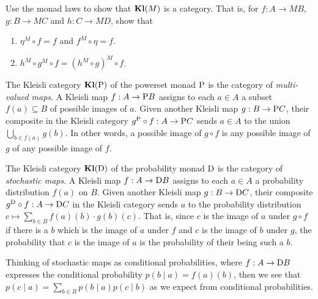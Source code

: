 \documentclass[DynamicalBook]{subfiles}
\begin{document}
\begin{exercise}
  Use the monad laws to show that $\textbf{Kl}(M)$ is a category. That is, for $f :
  A \to M B$, $g : B \to MC$ and $h : C \to MD$, show that
  \begin{enumerate}
    \item $\eta^M \circ f = f$ and $f^M \circ \eta = f$.
    \item $h^M \circ g^M \circ f = (h^M \circ g)^M \circ f$.
  \end{enumerate}
\end{exercise}

\begin{example}\label{ex.powerset_kleisli}
  The Kleisli category $\textbf{Kl}(\mathrm{P})$ of the powerset monad $\mathrm{P}$ is
  the category of \emph{multi-valued maps}. A Kleisli map $f : A \to
  \mathrm{P} B$ assigns to each $a \in A$ a subset $f(a) \subseteq B$ of possible
  images of $a$. Given another Kleisli map $g : B \to \mathrm{P} C$, their
  composite in the Kleisli category $g^{\mathrm{P}} \circ f : A \to \mathrm{P} C$
  sends $a \in A$ to the union $\bigcup_{b \in f(a)} g(b)$. In other words, a
  possible image of $g \circ f$ is any possible image of $g$ of any possible
  image of $f$.
\end{example}

\begin{example}\label{ex.probset_kleisli}
  The Kleisli category $\textbf{Kl}(\mathrm{D})$ of the probability monad $\mathrm{D}$
  is the category of \emph{stochastic maps}. A Kleisli map $f : A \to \mathrm{D}
  B$ assigns to each $a \in A$ a probability distribution $f(a)$ on $B$. Given
  another Kleisli map $g : B \to \mathrm{D} C$, their composite $g^{\mathrm{D}}
  \circ f : A \to \mathrm{D} C$ in the Kleisli category sends $a$ to the
  probability distribution $c \mapsto \sum_{b \in B}
  f(a)(b) \cdot g(b)(c)$. That is, since $c$ is the image of $a$ under $g \circ f$ if there is a $b$ which
  is the image of $a$ under $f$ and $c$ is the image of $b$ under $g$, the
  probability that $c$ is the image of $a$ is the probability of their being
  such a $b$.

  Thinking of stochastic maps as conditional probabilities, where $f : A \to
  \mathrm{D} B$ expresses the conditional probability $p(b \mid a) = f(a)(b)$,
  then we see that
  $p(c \mid a) = \sum_{b \in B} p(b \mid a) p(c \mid b)$
  as we expect from conditional probabilities.
\end{example}
\end{document}
